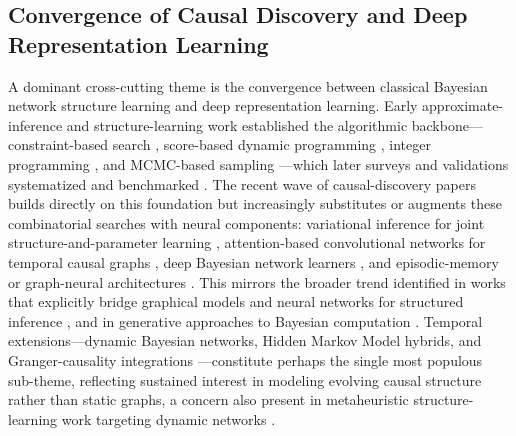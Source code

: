 \subsection{Convergence of Causal Discovery and Deep Representation Learning}
A dominant cross-cutting theme is the convergence between classical Bayesian network structure learning and deep representation learning. Early approximate-inference and structure-learning work established the algorithmic backbone---constraint-based search \cite{tsamardinos2006max,madsen2016parallel}, score-based dynamic programming \cite{singh2018finding}, integer programming \cite{cussens2017bayesian}, and MCMC-based sampling \cite{kuipers2021efficient}---which later surveys and validations systematized and benchmarked \cite{kitson2023survey,zhou2011structure,constantinou2021large,kitson2024impact}. The recent wave of causal-discovery papers builds directly on this foundation but increasingly substitutes or augments these combinatorial searches with neural components: variational inference for joint structure-and-parameter learning \cite{zhang2026causalp,zhang2026causalb}, attention-based convolutional networks for temporal causal graphs \cite{nauta2019causal}, deep Bayesian network learners \cite{zhang2026causalo}, and episodic-memory or graph-neural architectures \cite{zhang2026causalq,zhang2026graph,zhang2026graphb}. This mirrors the broader trend identified in works that explicitly bridge graphical models and neural networks for structured inference \cite{j2016composing,mnih2014neural,gal2015bayesian,mobiny2021dropconnect}, and in generative approaches to Bayesian computation \cite{polson2023generative}. Temporal extensions---dynamic Bayesian networks, Hidden Markov Model hybrids, and Granger-causality integrations \cite{zhang2026causale,zhang2026causalf,zhang2026causalm,zhang2026dynamicb,zhang2026dynamic,motzek2017indirect,liang2020dynamic,figueroa2013temporal}---constitute perhaps the single most populous sub-theme, reflecting sustained interest in modeling evolving causal structure rather than static graphs, a concern also present in metaheuristic structure-learning work targeting dynamic networks \cite{meng2024dynamic}.

